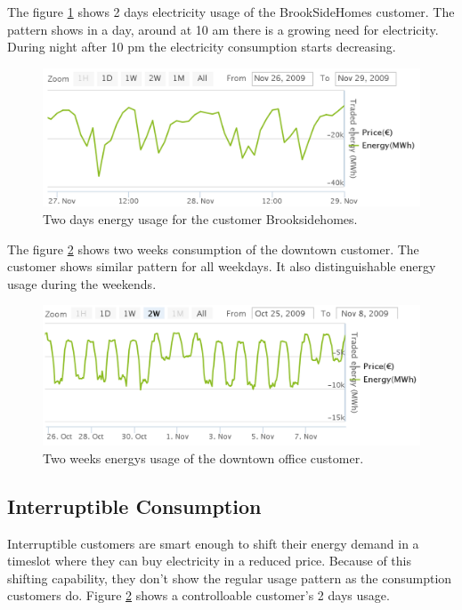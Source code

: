The figure  \ref{fig:2daysbrook} shows 2 days electricity usage of the BrookSideHomes customer. The pattern shows in a day, around at 10 am there is a growing need for electricity. During night after 10 pm the electricity consumption starts decreasing.
\begin{figure}[h!]
  \includegraphics[width=\linewidth]{BrooksideHomes-2days.png}
  \caption{Two days energy usage for the customer Brooksidehomes.}
  \label{fig:2daysbrook}
\end{figure}

The figure \ref{fig:2weekOffice} shows two weeks consumption of the downtown customer. The customer shows similar pattern for all weekdays. It also distinguishable energy usage during the weekends.

\begin{figure}[h!]
  \includegraphics[width=\linewidth]{downtown-offc-2-weeks.png}
  \caption{Two weeks energys usage of the downtown office customer.}
  \label{fig:2weekOffice}
\end{figure}

\subsection{Interruptible Consumption}
Interruptible customers are smart enough to shift their energy demand in a timeslot where they can buy electricity in a reduced price. Because of this shifting capability, they don't show the regular usage pattern as the consumption customers do. Figure \ref{fig:2weekOffice} shows a controlloable customer's 2 days usage.


